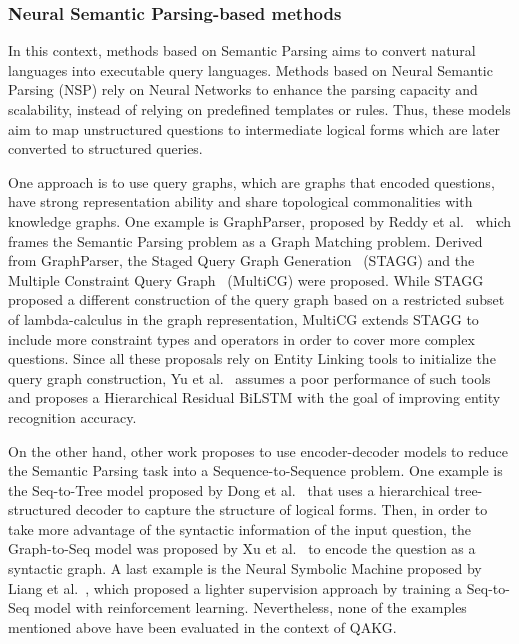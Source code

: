 \subsubsection{Neural Semantic Parsing-based methods}
In this context, methods based on Semantic Parsing aims to convert natural languages into 
executable query languages. Methods based on Neural Semantic Parsing (NSP) rely on Neural 
Networks to enhance the parsing capacity and scalability, instead of relying on predefined 
templates or rules. Thus, these models aim to map unstructured questions to intermediate 
logical forms which are later converted to structured queries.

One approach is to use query graphs, which are graphs that encoded questions, have strong 
representation ability and share topological commonalities with knowledge graphs. One example 
is GraphParser, proposed by Reddy et al.~\cite{qa:ReddyLS14} which frames the Semantic Parsing 
problem as a Graph Matching problem. Derived from GraphParser, the Staged Query Graph 
Generation~\cite{qa:YihCHG15} (STAGG) and the Multiple Constraint Query Graph~\cite{qa:BaoDYZZ16} 
(MultiCG) were proposed. While STAGG proposed a different construction of the query graph based 
on a restricted subset of lambda-calculus in the graph representation, MultiCG extends STAGG to 
include more constraint types and operators in order to cover more complex questions. Since all 
these proposals rely on Entity Linking tools to initialize the query graph construction, 
Yu et al.~\cite{qa:YuYHSXZ17} assumes a poor performance of such tools and proposes a 
Hierarchical Residual BiLSTM with the goal of improving entity recognition accuracy.

On the other hand, other work proposes to use encoder-decoder models to reduce the Semantic 
Parsing task into a Sequence-to-Sequence problem. One example is the Seq-to-Tree model proposed 
by Dong et al.~\cite{nmt:DongL16} that uses a hierarchical tree-structured decoder to capture 
the structure of logical forms. Then, in order to take more advantage of the syntactic 
information of the input question, the Graph-to-Seq model was proposed by Xu et al.~\cite{qa:XuWWYCS18} 
to encode the question as a syntactic graph. A last example is the Neural Symbolic Machine 
proposed by Liang et al.~\cite{qa:LiangBLFL17}, which proposed a lighter supervision approach 
by training a Seq-to-Seq model with reinforcement learning. Nevertheless, none of the examples 
mentioned above have been evaluated in the context of QAKG.

